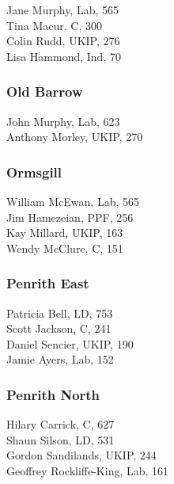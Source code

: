 \documentclass[a4paper,openany,10pt]{book}
\begin{document}


Jane Murphy, Lab, 565\\
Tina Macur, C, 300\\
Colin Rudd, UKIP, 276\\
Lisa Hammond, Ind, 70\\


\subsubsection*{Old Barrow}



John Murphy, Lab, 623\\
Anthony Morley, UKIP, 270\\


\subsubsection*{Ormsgill}



William McEwan, Lab, 565\\
Jim Hamezeian, PPF, 256\\
Kay Millard, UKIP, 163\\
Wendy McClure, C, 151\\


\subsubsection*{Penrith East}



Patricia Bell, LD, 753\\
Scott Jackson, C, 241\\
Daniel Sencier, UKIP, 190\\
Jamie Ayers, Lab, 152\\


\subsubsection*{Penrith North}



Hilary Carrick, C, 627\\
Shaun Silson, LD, 531\\
Gordon Sandilands, UKIP, 244\\
{Geoffrey Rockliffe-King}, Lab, 161\\
\end{document}
